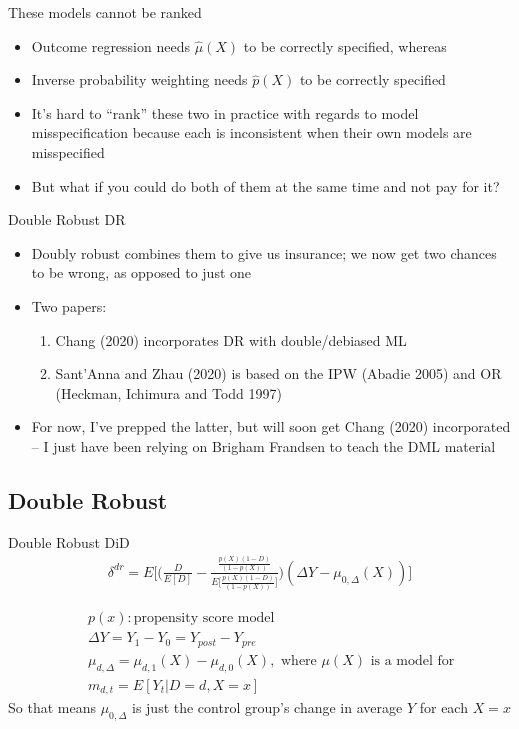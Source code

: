 \documentclass{beamer}
\begin{document}
\begin{frame}{These models cannot be ranked}

\begin{itemize}
\item Outcome regression needs $\widehat{\mu}(X)$ to be correctly specified, whereas
\item Inverse probability weighting needs $\widehat{p}(X)$ to be correctly specified
\item It's hard to ``rank'' these two in practice with regards to model misspecification because each is inconsistent when their own models are misspecified
\item But what if you could do both of them at the same time and not pay for it?
\end{itemize}

\end{frame}

\begin{frame}{Double Robust DR}

\begin{itemize}
\item Doubly robust combines them to give us insurance; we now get two chances to be wrong, as opposed to just one
\item Two papers:
	\begin{enumerate}
	\item Chang (2020) incorporates DR with double/debiased ML
	\item Sant'Anna and Zhau (2020) is based on the IPW (Abadie 2005) and OR (Heckman, Ichimura and Todd 1997)
	\end{enumerate}
\item For now, I've prepped the latter, but will soon get Chang (2020) incorporated -- I just have been relying on Brigham Frandsen to teach the DML material
\end{itemize}

\end{frame}


\subsection{Double Robust}

\begin{frame}{Double Robust DiD}
\begin{eqnarray*}
\delta^{dr} = E \bigg [ \bigg ( \frac{D}{E[D]} -\frac{ \frac{p(X)(1-D)}{(1-p(X))} }{E \bigg [\frac{p(X)(1-D)}{(1-p(X))} \bigg ]} \bigg  )( \Delta Y - \mu_{0,\Delta}(X)) \bigg ]
\end{eqnarray*}

\begin{eqnarray*}
&&p(x): \text{propensity score model} \\
&& \Delta Y = Y_1 - Y_0 = Y_{post} - Y_{pre} \\
&& \mu_{d,\Delta} = \mu_{d,1}(X) - \mu_{d,0}(X), \text{ where } \mu(X) \text{ is a model for} \\
&& m_{d,t} = E[Y_t|D=d,X=x]
\end{eqnarray*}So that means $\mu_{0,\Delta}$ is just the control group's change in average $Y$ for each $X=x$

\end{frame}
\end{document}
